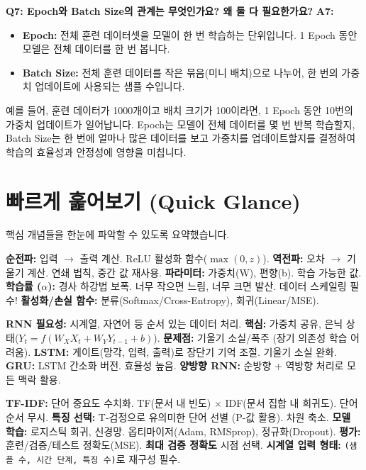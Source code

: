 \documentclass[11pt,a4paper]{article}
\theoremstyle{definition}
\begin{document}
\begin{tcolorbox}[title=\textbf{자주 묻는 질문}]
\textbf{Q7: Epoch와 Batch Size의 관계는 무엇인가요? 왜 둘 다 필요한가요?}
\textbf{A7:}
\begin{itemize}
    \item \textbf{Epoch:} 전체 훈련 데이터셋을 모델이 한 번 학습하는 단위입니다. 1 Epoch 동안 모델은 전체 데이터를 한 번 봅니다.
    \item \textbf{Batch Size:} 전체 훈련 데이터를 작은 묶음(미니 배치)으로 나누어, 한 번의 가중치 업데이트에 사용되는 샘플 수입니다.
\end{itemize}
예를 들어, 훈련 데이터가 1000개이고 배치 크기가 100이라면, 1 Epoch 동안 10번의 가중치 업데이트가 일어납니다. Epoch는 모델이 전체 데이터를 몇 번 반복 학습할지, Batch Size는 한 번에 얼마나 많은 데이터를 보고 가중치를 업데이트할지를 결정하여 학습의 효율성과 안정성에 영향을 미칩니다.
\end{tcolorbox}

\newpage
\section{빠르게 훑어보기 (Quick Glance)}
핵심 개념들을 한눈에 파악할 수 있도록 요약했습니다.

\begin{tcolorbox}[colback=myblue!10!white, colframe=myblue!75!black, title=\textbf{신경망 기본}]
\textbf{순전파:} 입력 $\rightarrow$ 출력 계산. ReLU 활성화 함수($\max(0,z)$).
\textbf{역전파:} 오차 $\rightarrow$ 기울기 계산. 연쇄 법칙, 중간 값 재사용.
\textbf{파라미터:} 가중치(W), 편향(b). 학습 가능한 값.
\textbf{학습률 ($\alpha$):} 경사 하강법 보폭. 너무 작으면 느림, 너무 크면 발산. 데이터 스케일링 필수!
\textbf{활성화/손실 함수:} 분류(Softmax/Cross-Entropy), 회귀(Linear/MSE).
\end{tcolorbox}

\begin{tcolorbox}[colback=mygreen!10!white, colframe=mygreen!75!black, title=\textbf{시퀀스 데이터와 RNN}]
\textbf{RNN 필요성:} 시계열, 자연어 등 순서 있는 데이터 처리.
\textbf{핵심:} 가중치 공유, 은닉 상태($Y_t = f(W_X X_t + W_Y Y_{t-1} + b)$).
\textbf{문제점:} 기울기 소실/폭주 (장기 의존성 학습 어려움).
\textbf{LSTM:} 게이트(망각, 입력, 출력)로 장단기 기억 조절. 기울기 소실 완화.
\textbf{GRU:} LSTM 간소화 버전. 효율성 높음.
\textbf{양방향 RNN:} 순방향 + 역방향 처리로 모든 맥락 활용.
\end{tcolorbox}

\begin{tcolorbox}[colback=myorange!10!white, colframe=myorange!75!black, title=\textbf{텍스트 처리 및 모델 평가}]
\textbf{TF-IDF:} 단어 중요도 수치화. TF(문서 내 빈도) $\times$ IDF(문서 집합 내 희귀도). 단어 순서 무시.
\textbf{특징 선택:} T-검정으로 유의미한 단어 선별 (P-값 활용). 차원 축소.
\textbf{모델 학습:} 로지스틱 회귀, 신경망. 옵티마이저(Adam, RMSprop), 정규화(Dropout).
\textbf{평가:} 훈련/검증/테스트 정확도(MSE). \textbf{최대 검증 정확도} 시점 선택.
\textbf{시계열 입력 형태:} \texttt{(샘플 수, 시간 단계, 특징 수)}로 재구성 필수.
\end{tcolorbox}
\end{document}
